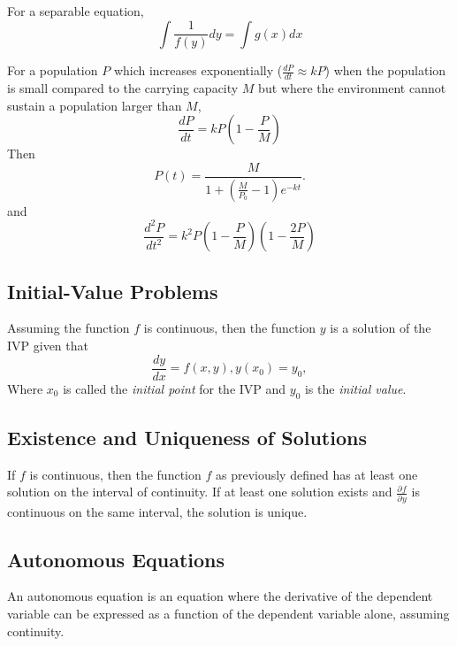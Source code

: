 \begin{theorem} For a separable equation,
  \[
    \int \frac{1}{f(y)} dy = \int g(x) dx
  \]
\end{theorem}

\begin{definition} For a population $P$ which increases exponentially ($\frac{dP}{dt} \approx kP$) when the population is small compared to the carrying capacity $M$ but where the environment cannot sustain a population larger than $M$,
  \[
    \frac{dP}{dt} = kP \left(1 - \frac{P}{M}\right)
  \]
  Then
  \[
    P(t) = \frac{M}{1 + \left(\frac{M}{P_0} - 1\right)e^{-kt}}.
  \]
  and
  \[
    \frac{d^2P}{dt^2} = k^2P \left(1 - \frac{P}{M}\right) \left(1 - \frac{2P}{M}\right)
  \]
\end{definition}

\subsection{Initial-Value Problems}

\begin{definition}
    Assuming the function $f$ is continuous, then the function $y$ is a solution of the IVP given that
    \[
        \frac{dy}{dx} = f(x,y), y(x_0) = y_0,
    \]
    Where $x_0$ is called the \textit{initial point} for the IVP and $y_0$ is the \textit{initial value}.
\end{definition}

\subsection{Existence and Uniqueness of Solutions}

\begin{theorem}
    If $f$ is continuous, then the function $f$ as previously defined has at least one solution on the interval of continuity. If at least one solution exists and $\frac{\partial^{}f}{\partial^{}y}$ is continuous on the same interval, the solution is unique.
\end{theorem}

\subsection{Autonomous Equations}

\begin{definition}
    An autonomous equation is an equation where the derivative of the dependent variable can be expressed as a function of the dependent variable alone, assuming continuity.
\end{definition}

